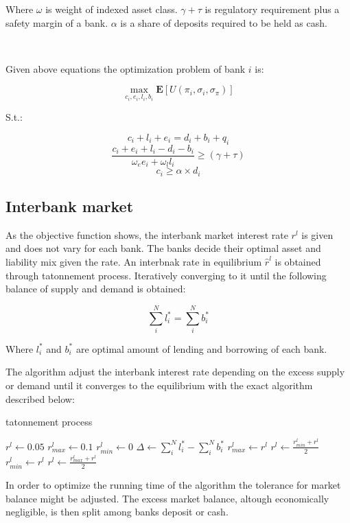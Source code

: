 \documentclass{article}
\begin{document}
Where $\omega$ is weight of indexed asset class. $\gamma + \tau$ is regulatory requirement plus a safety margin of a bank. $\alpha$ is a share of deposits required to be held as cash.

\

Given above equations the optimization problem of bank $i$ is:

\[\max_{c_i, e_i, l_i, b_i} \mathbf{E}[U(\pi_i, \sigma_i, \sigma_\pi)]\]

S.t.:

\[c_i + l_i + e_i = d_i + b_i + q_i\]
\[\frac{c_i + e_i + l_i - d_i - b_i}{\omega_e e_i + \omega_l l_i} \geq (\gamma + \tau)\]
\[c_i \geq \alpha \times d_i\]

\subsection*{Interbank market}

As the objective function shows, the interbank market interest rate $r^l$ is given and does not vary for each bank. The banks decide their optimal asset and liability mix given the rate. An interbnak rate in equilibrium $\hat{r}^l$ is obtained through tatonnement process. Iteratively converging to it until the following balance of supply and demand is obtained:

\[\sum_{i}^{N} l_i^* = \sum_{i}^{N} b_i^*\]

Where $l_i^*$ and $b_i^*$ are optimal amount of lending and borrowing of each bank.

The algorithm adjust the interbank interest rate depending on the excess supply or demand until it converges to the equilibrium with the exact algorithm described below:

\begin{algorithm}
  \caption{tatonnement process}\label{alg:cap}
  \begin{algorithmic}
  \State $r^l \gets 0.05$
  \State $r^l_{max} \gets 0.1$
  \State $r^l_{min} \gets 0$
  \State $\Delta \gets \sum_{i}^{N} l_i^* - \sum_{i}^{N} b_i^*$
      \State $r^l_{max} \gets r^l$
      \State $r^l \gets \frac{r^l_{min} + r^l}{2}$
      \State $r^l_{min} \gets r^l$
      \State $r^l \gets \frac{r^l_{max} + r^l}{2}$
  \EndIf
  \EndWhile
  \end{algorithmic}
\end{algorithm}

\newpage

In order to optimize the running time of the algorithm the tolerance for market balance might be adjusted. The excess market balance, altough economically negligible, is then split among banks deposit or cash.  
\end{document}

